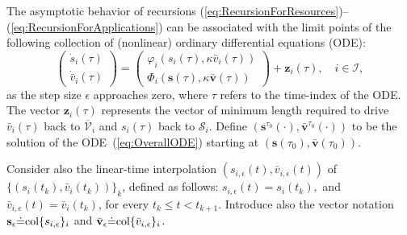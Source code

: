 \documentclass[letter,11pt]{article}
\begin{document}
The asymptotic behavior of recursions (\ref{eq:RecursionForResources})--(\ref{eq:RecursionForApplications}) can be associated with the limit points of the following collection of (nonlinear) ordinary differential equations (ODE):
\begin{equation} \label{eq:OverallODE}
 \left(\begin{array}{c}
    \dot{s}_i(\tau) \\ \dot{\bar{v}}_i(\tau)
  \end{array}
    \right) = \left(\begin{array}{c}\varphi_i(s_i(\tau),\kappa{\bar{v}}_i(\tau)) \\ \Phi_i({\mathbf{s}}(\tau),\kappa{\bar{\mathbf{v}}}(\tau)) \end{array}\right) + {\mathbf{z}}_i(\tau), \quad i\in\mathcal{I},
\end{equation}
as the step size $\epsilon$ approaches zero, where $\tau$ refers to the time-index of the ODE.
The vector ${\mathbf{z}}_i(\tau)$ represents the vector of minimum length required to drive ${\bar{v}}_i(\tau)$ back to ${\overline{\mathcal{V}}}_i$ and $s_i(\tau)$ back to $\mathcal{S}_i$. Define $({\mathbf{s}}^{\tau_0}(\cdot),{\bar{\mathbf{v}}}^{\tau_0}(\cdot))$ to be the solution of the ODE~(\ref{eq:OverallODE}) starting at $({\mathbf{s}}(\tau_0),{\bar{\mathbf{v}}}(\tau_0))$. 

Consider also the linear-time interpolation $(s_{i,\epsilon}(t),{\bar{v}}_{i,\epsilon}(t))$ of $\{(s_{i}(t_k),{\bar{v}}_i(t_k))\}_k$, defined as follows: $s_{i,\epsilon}(t) = s_i(t_k),$ and ${\bar{v}}_{i,\epsilon}(t) = {\bar{v}}_i(t_k)$, for every $t_k \leq t < t_{k+1}$. Introduce also the vector notation ${\mathbf{s}}_{\epsilon}{\doteq}{\rm col}\{s_{i,\epsilon}\}_i$ and ${\bar{\mathbf{v}}}_{\epsilon}{\doteq}{\rm col}\{{\bar{v}}_{i,\epsilon}\}_i$. 
\end{document}
